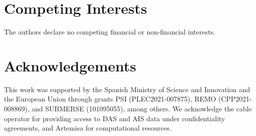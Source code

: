 \documentclass[11pt]{article}
\begin{document}
\section*{Competing Interests}
The authors declare no competing financial or non-financial interests.

\section*{Acknowledgements}
This work was supported by the Spanish Ministry of Science and Innovation and the European Union through grants PSI (PLEC2021-007875), REMO (CPP2021-008869), and SUBMERSE (101095055), among others. We acknowledge the cable operator for providing access to DAS and AIS data under confidentiality agreements, and Artemisa for computational resources.
\end{document}
